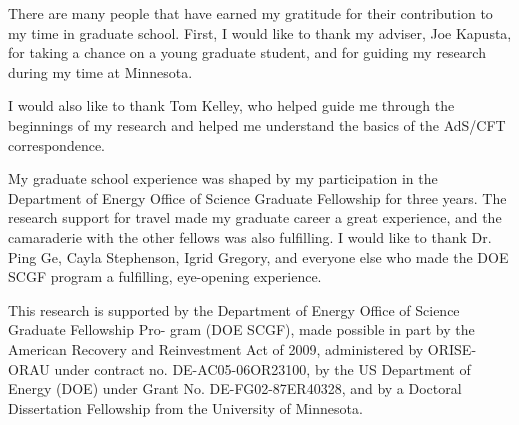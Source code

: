 
There are many people that have earned my gratitude for their contribution to my
time in graduate school. 
First, I would like to thank my adviser, Joe Kapusta, for taking a chance on a young graduate student, and for guiding my research during my time at Minnesota.

I would also like to thank Tom Kelley, who helped guide me through the beginnings of my research and helped me understand the basics of the AdS/CFT correspondence.

My graduate school experience was shaped by my participation in the Department of Energy Office of Science Graduate Fellowship for three years. 
The research support for travel made my graduate career a great experience, and the camaraderie with the other fellows was also fulfilling.
I would like to thank Dr. Ping Ge, Cayla Stephenson, Igrid Gregory, and everyone else who made the DOE SCGF program a fulfilling, eye-opening experience.

This research is supported by the Department of Energy Office of Science Graduate Fellowship Pro- gram (DOE SCGF), made possible in part by the American Recovery and Reinvestment Act of 2009, administered by ORISE-ORAU under contract no. DE-AC05-06OR23100, by the US Department of Energy (DOE) under Grant No. DE-FG02-87ER40328, and by a Doctoral Dissertation Fellowship from the University of Minnesota.

